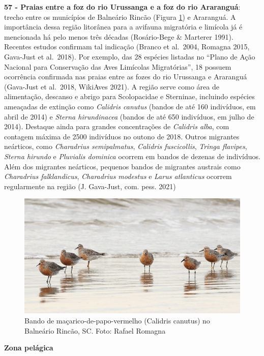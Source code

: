 \documentclass[
  oneside]{scrbook}
\begin{document}
\textbf{57 - Praias entre a foz do rio Urussanga e a foz do rio Araranguá}: trecho entre os municípios de Balneário Rincão (Figura \ref{fig:28}) e Araranguá. A importância dessa região litorânea para a avifauna migratória e limícola já é mencionada há pelo menos três décadas (Rosário-Bege \& Marterer 1991). Recentes estudos confirmam tal indicação (Branco et al.~2004, Romagna 2015, Gava-Just et al.~2018). Por exemplo, das 28 espécies listadas no ``Plano de Ação Nacional para Conservação das Aves Limícolas Migratórias'', 18 possuem ocorrência confirmada nas praias entre as fozes do rio Urussanga e Araranguá (Gava-Just et al.~2018, WikiAves 2021). A região serve como área de alimentação, descanso e abrigo para Scolopacidae e Sterninae, incluindo espécies ameaçadas de extinção como \emph{Calidris canutus} (bandos de até 160 indivíduos, em abril de 2014) e \emph{Sterna hirundinacea} (bandos de até 650 indivíduos, em julho de 2014). Destaque ainda para grandes concentrações de \emph{Calidris alba}, com contagem máxima de 2500 indivíduos no outono de 2018. Outros migrantes neárticos, como \emph{Charadrius semipalmatus}, \emph{Calidris fuscicollis}, \emph{Tringa flavipes}, \emph{Sterna hirundo} e \emph{Pluvialis dominica} ocorrem em bandos de dezenas de indivíduos. Além dos migrantes neárticos, pequenos bandos de migrantes austrais como \emph{Charadrius falklandicus}, \emph{Charadrius modestus} e \emph{Larus atlanticus} ocorrem regularmente na região (J. Gava-Just, com. pess. 2021)\\

\begin{figure}[H]

{\centering \includegraphics[width=0.75\linewidth]{imagens/cap07/Figura_7.8} 

}

\caption{Bando de maçarico-de-papo-vermelho (Calidris canutus) no Balneário Rincão, SC. Foto: Rafael Romagna}\label{fig:28}
\end{figure}

\textbf{Zona pelágica}
\end{document}
